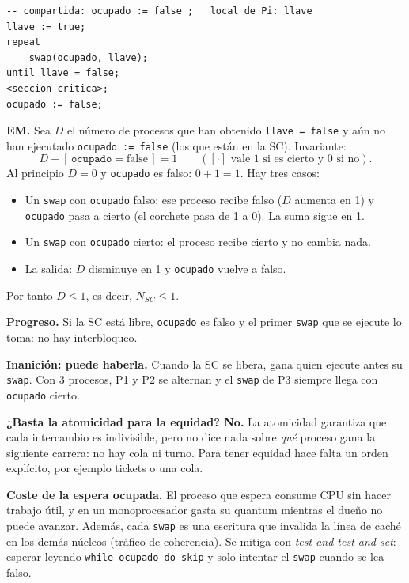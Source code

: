 \begin{solucion}
\begin{lstlisting}
-- compartida: ocupado := false ;   local de Pi: llave
llave := true;
repeat
    swap(ocupado, llave);
until llave = false;
<seccion critica>;
ocupado := false;
\end{lstlisting}
\textbf{EM.} Sea $D$ el número de procesos que han obtenido \texttt{llave = false} y aún no han ejecutado
\texttt{ocupado := false} (los que están en la SC). Invariante:
\[
D + [\,\texttt{ocupado} = \text{false}\,] = 1 \qquad ([\cdot] \text{ vale 1 si es cierto y 0 si no}).
\]
Al principio $D = 0$ y \texttt{ocupado} es falso: $0 + 1 = 1$. Hay tres casos:
\begin{itemize}[leftmargin=*,noitemsep]
  \item Un \texttt{swap} con \texttt{ocupado} falso: ese proceso recibe falso ($D$ aumenta en 1) y
        \texttt{ocupado} pasa a cierto (el corchete pasa de 1 a 0). La suma sigue en 1.
  \item Un \texttt{swap} con \texttt{ocupado} cierto: el proceso recibe cierto y no cambia nada.
  \item La salida: $D$ disminuye en 1 y \texttt{ocupado} vuelve a falso.
\end{itemize}
Por tanto $D \le 1$, es decir, $N_{SC} \le 1$.

\textbf{Progreso.} Si la SC está libre, \texttt{ocupado} es falso y el primer \texttt{swap} que se ejecute lo toma:
no hay interbloqueo.

\textbf{Inanición: puede haberla.} Cuando la SC se libera, gana quien ejecute antes su \texttt{swap}. Con 3 procesos,
P1 y P2 se alternan y el \texttt{swap} de P3 siempre llega con \texttt{ocupado} cierto.

\textbf{¿Basta la atomicidad para la equidad? No.} La atomicidad garantiza que cada intercambio es indivisible,
pero no dice nada sobre \emph{qué} proceso gana la siguiente carrera: no hay cola ni turno. Para tener equidad hace
falta un orden explícito, por ejemplo tickets o una cola.

\textbf{Coste de la espera ocupada.} El proceso que espera consume CPU sin hacer trabajo útil, y en un
monoprocesador gasta su quantum mientras el dueño no puede avanzar. Además, cada \texttt{swap} es una escritura que
invalida la línea de caché en los demás núcleos (tráfico de coherencia). Se mitiga con
\emph{test-and-test-and-set}: esperar leyendo \texttt{while ocupado do skip} y solo intentar el \texttt{swap}
cuando se lea falso.
\end{solucion}

